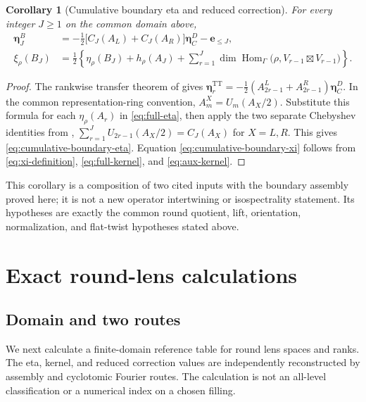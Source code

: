 \documentclass[11pt]{article}
\newtheorem{corollary}[theorem]{Corollary}
\theoremstyle{definition}
\newcommand{\etaInv}{\eta}
\newcommand{\Hom}{\operatorname{Hom}}
\newcommand{\TT}{\mathrm{TT}}
\begin{document}
\begin{corollary}[Cumulative boundary eta and reduced correction]
\label{cor:cumulative-boundary-eta-xi}
For every integer $J\geq1$ on the common domain above,
\begin{align}
 \boldsymbol\eta^B_J
 &=-\frac12\bigl[C_J(A_L)+C_J(A_R)\bigr]
   \boldsymbol\eta^D_C-\boldsymbol e_{\leq J},
 \label{eq:cumulative-boundary-eta}\\
 \xi_\rho(B_J)
 &=\frac12\left\{\etaInv_\rho(B_J)+h_\rho(A_J)
   +\sum_{r=1}^{J}\dim\Hom_\Gamma
   \bigl(\rho,V_{r-1}\boxtimes V_{r-1}\bigr)\right\}.
 \label{eq:cumulative-boundary-xi}
\end{align}
\end{corollary}

\begin{proof}
The rankwise transfer theorem of
\cite{Mahmood2026DiracToTensorCurlEtaTransfer} gives
$\boldsymbol\eta^{\TT}_r=-\tfrac12(A^L_{2r-1}+A^R_{2r-1})
\boldsymbol\eta^D_C$.  In the common representation-ring convention,
$A^X_m=U_m(A_X/2)$.  Substitute this formula for each
$\etaInv_\rho(A_r)$ in \eqref{eq:full-eta}, then apply the two separate
Chebyshev identities from \cite{Mahmood2026BivariateMcKay},
$\sum_{r=1}^{J}U_{2r-1}(A_X/2)=C_J(A_X)$ for $X=L,R$.  This gives
\eqref{eq:cumulative-boundary-eta}.  Equation
\eqref{eq:cumulative-boundary-xi} follows from
\eqref{eq:xi-definition}, \eqref{eq:full-kernel}, and
\eqref{eq:aux-kernel}.
\end{proof}

This corollary is a composition of two cited inputs with the boundary
assembly proved here; it is not a new operator intertwining or isospectrality
statement.  Its hypotheses are exactly the common round quotient, lift,
orientation, normalization, and flat-twist hypotheses stated above.

\section{Exact round-lens calculations}

\subsection{Domain and two routes}

We next calculate a finite-domain reference table for round lens spaces and
ranks.  The eta, kernel, and reduced correction values are independently
reconstructed by assembly and cyclotomic Fourier routes.  The calculation is
not an all-level classification or a numerical index on a chosen filling.
\end{document}
